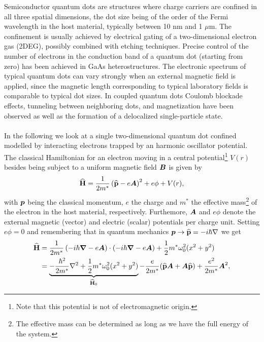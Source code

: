 Semiconductor quantum dots are structures where
charge carriers are confined in all three spatial dimensions, 
the dot size being of the order of the Fermi wavelength 
in the host material, typically between  10 nm and  1 $\mu$m.
The confinement is usually achieved by electrical gating of a 
two-dimensional electron gas (2DEG), 
possibly combined with etching techniques. Precise control of the
number of electrons in the conduction band of a quantum dot 
(starting from zero) has been achieved in GaAs heterostructures. 
The electronic spectrum of typical quantum dots
can vary strongly when an external magnetic field is applied, 
since the magnetic length corresponding to typical 
laboratory fields  is comparable to typical dot sizes.
In coupled quantum dots Coulomb blockade effects, 
tunneling between neighboring dots, and magnetization 
have been observed as well as the formation of a
delocalized single-particle state. \\
\\
In the following we look at a single two-dimensional quantum dot confined modelled by interacting electrons trapped by an harmonic oscillator potential. The classical Hamiltonian for an electron  moving in a central potential\footnote{Note that this potential is not of electromagnetic origin.} $V(r)$ besides being subject to a uniform magnetic field $\boldsymbol{B}$ is given by\cite{Zettili2001,Ferry2001}
\begin{equation*}
{\bf\widehat{H}} = \frac{1}{2m^*}\left({\bf\widehat{p}} - e \boldsymbol{A}\right)^2 + e\phi + V(r),
\end{equation*}
with $\boldsymbol{p}$ being the classical momentum, $e$ the charge and $m^*$ the effective mass\footnote{The effective mass can be determined as long as we have the full energy of the system.} of the electron in the host material, respectively. Furthemore, $\boldsymbol{A}$ and $e\phi$ denote the external magnetic (vector) and electric (scalar) potentials per charge unit.  Setting $e\phi = 0$ and remembering that in quantum mechanics $\boldsymbol{p} \rightarrow {\bf\widehat{p}} = - i \hbar \nabla$ we get
\begin{align}
{\bf\widehat{H}} &=  \frac{1}{2m^*}\left(-i \hbar\boldsymbol{\nabla} - e\boldsymbol{A}\right) \cdot \left(-i \hbar\boldsymbol{\nabla} - e \boldsymbol{A}\right) +  \frac{1}{2} m^* \omega_{0}^{2}(x^2 + y^2)\nonumber\\
 &= \underbrace{-\frac{\hbar^2}{2m^*}\nabla^2 + \frac{1}{2} m^* \omega_{0}^{2}(x^2 + y^2)}_{{\bf\widehat{H}}_0} - \frac{e}{2m^*}({\bf\widehat{p}}\boldsymbol{A}+\boldsymbol{A}{\bf\widehat{p}}) + \frac{e^2}{2m^*}\boldsymbol{A}^2\label{HMwithoutS},
\end{align}
